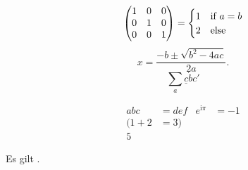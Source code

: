 \documentclass{article}
\begin{document}
\LuaMMLTagAF{} {
\[
  \begin{pmatrix}
    1 & 0 & 0 \\
    0 & 1 & 0 \\
    0 & 0 & 1
  \end{pmatrix}
  =
  \begin{cases}
    1 & $if $a=b\\
    2 & $else$
  \end{cases}
\]
}
\LuaMMLTagAF{} {
\[
  x = \frac{-b \pm \sqrt{b^2-4ac}}{2a}.
\]
}
\LuaMMLTagAF{} {
\[
  \sum_a\underline c\dot bc'
\]
}

\LuaMMLTagAF{} {
\begin{align}
  abc&=def & e^{\mathrm{i}\pi}&=-1\\
  \Big(1+2&=3\Big)\\
  5
\end{align}
}

Es gilt .
\tagstructend
\end{document}
